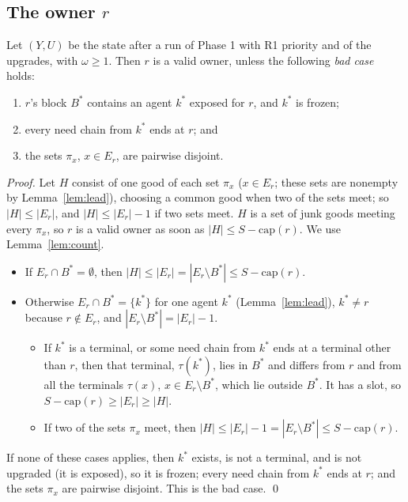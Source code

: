 \documentclass[runningheads,11pt]{llncs}
\newcommand{\capa}{\mathrm{cap}}
\begin{document}
\subsection{The owner $r$}\label{sec:thmA}

\begin{theorem}\label{thm:A}
Let $(Y,U)$ be the state after a run of Phase 1 with R1 priority and of the upgrades, with $\omega\ge1$. Then $r$ is a valid owner, unless the following \emph{bad case} holds:
\begin{enumerate}
\item[(i)] $r$'s block $B^*$ contains an agent $k^*$ exposed for $r$, and $k^*$ is frozen;
\item[(ii)] every need chain from $k^*$ ends at $r$; and
\item[(iii)] the sets $\pi_x$, $x\in E_r$, are pairwise disjoint.
\end{enumerate}
\end{theorem}

\begin{proof}
Let $H$ consist of one good of each set $\pi_x$ ($x\in E_r$; these sets are nonempty by Lemma~\ref{lem:lead}), choosing a common good when two of the sets meet; so $|H|\le|E_r|$, and $|H|\le|E_r|-1$ if two sets meet. $H$ is a set of junk goods meeting every $\pi_x$, so $r$ is a valid owner as soon as $|H|\le S-\capa(r)$. We use Lemma~\ref{lem:count}.
\begin{itemize}
\item If $E_r\cap B^*=\emptyset$, then $|H|\le|E_r|=|E_r\setminus B^*|\le S-\capa(r)$.
\item Otherwise $E_r\cap B^*=\{k^*\}$ for one agent $k^*$ (Lemma~\ref{lem:lead}), $k^*\ne r$ because $r\notin E_r$, and $|E_r\setminus B^*|=|E_r|-1$.
\begin{itemize}
\item If $k^*$ is a terminal, or some need chain from $k^*$ ends at a terminal other than $r$, then that terminal, $\tau(k^*)$, lies in $B^*$ and differs from $r$ and from all the terminals $\tau(x)$, $x\in E_r\setminus B^*$, which lie outside $B^*$. It has a slot, so $S-\capa(r)\ge|E_r|\ge|H|$.
\item If two of the sets $\pi_x$ meet, then $|H|\le|E_r|-1=|E_r\setminus B^*|\le S-\capa(r)$.
\end{itemize}
\end{itemize}
If none of these cases applies, then $k^*$ exists, is not a terminal, and is not upgraded (it is exposed), so it is frozen; every need chain from $k^*$ ends at $r$; and the sets $\pi_x$ are pairwise disjoint. This is the bad case. \qed
\end{proof}
\end{document}
